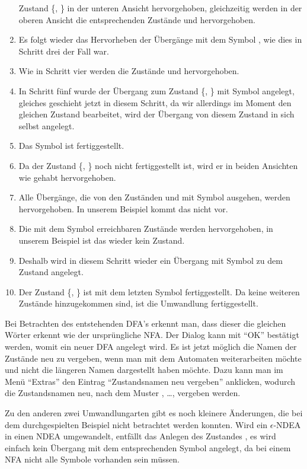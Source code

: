 \begin{enumerate}
  Zustand \{, \} in der unteren Ansicht hervorgehoben, gleichzeitig
  werden in der oberen Ansicht die entsprechenden Zustände  und
   hervorgehoben.
  \item Es folgt wieder das Hervorheben der Übergänge mit dem Symbol
  , wie dies in Schritt drei der Fall war.
  \item Wie in Schritt vier werden die Zustände  und 
  hervorgehoben.
  \item In Schritt fünf wurde der Übergang zum Zustand \{,
  \} mit Symbol  angelegt, gleiches geschieht jetzt in
  diesem Schritt, da wir allerdings im Moment den gleichen Zustand bearbeitet,
  wird der Übergang von diesem Zustand in sich selbst angelegt.
  \item Das Symbol  ist fertiggestellt.
  \item Da der Zustand \{, \} noch nicht fertiggestellt
  ist, wird er in beiden Ansichten wie gehabt hervorgehoben.
  \item Alle Übergänge, die von den Zuständen  und  mit
  Symbol  ausgehen, werden hervorgehoben. In unserem Beispiel kommt
  das nicht vor.
  \item Die mit dem Symbol  erreichbaren Zustände werden
  hervorgehoben, in unserem Beispiel ist das wieder kein Zustand.
  \item Deshalb wird in diesem Schritt wieder ein Übergang mit Symbol
   zu dem Zustand \State{$\emptyset$} angelegt.
  \item Der Zustand \{, \} ist mit dem letzten Symbol
   fertiggestellt. Da keine weiteren Zustände hinzugekommen sind, ist
  die Umwandlung fertiggestellt.
\end{enumerate}

Bei Betrachten des entstehenden DFA's erkennt man, dass dieser die gleichen
Wörter erkennt wie der ursprüngliche NFA. Der Dialog kann mit "`OK"' bestätigt
werden, womit ein neuer DFA angelegt wird. Es ist jetzt möglich die Namen der
Zustände neu zu vergeben, wenn man mit dem Automaten weiterarbeiten möchte und
nicht die längeren Namen dargestellt haben möchte. Dazu kann man im Menü
"`Extras"' den Eintrag "`Zustandsnamen neu vergeben"' anklicken, wodurch die
Zustandsnamen neu, nach dem Muster ,  \ldots, vergeben
werden.\vspace{10pt}

Zu den anderen zwei Umwandlungarten gibt es noch kleinere Änderungen, die bei dem
durchgespielten Beispiel nicht betrachtet werden konnten. Wird ein
$\epsilon$-NDEA in einen NDEA umgewandelt, entfällt das Anlegen des Zustandes
\State{$\emptyset$}, es wird einfach kein Übergang mit dem entsprechenden Symbol
angelegt, da bei einem NFA nicht alle Symbole vorhanden sein
müssen.\vspace{10pt}


